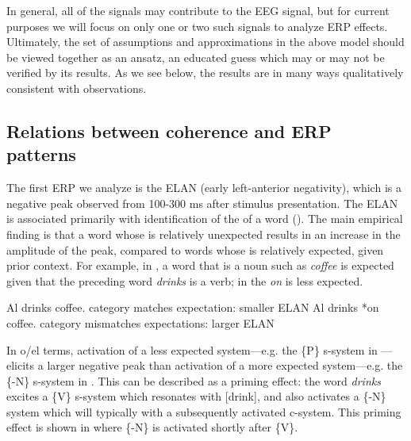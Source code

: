 In general, all of the  signals may contribute to the EEG signal, but for current purposes we will focus on only one or two such signals to analyze ERP effects. Ultimately, the set of assumptions and approximations in the above model should be viewed together as an ansatz, an educated guess which may or may not be verified by its results. As we see below, the results are in many ways qualitatively consistent with observations.

\subsection{Relations between coherence and ERP patterns}

The first ERP we analyze is the ELAN (early left-anterior negativity), which is a negative peak observed from 100-300 ms after stimulus presentation. The ELAN is associated primarily with identification of the  of a word (\citealt{Friederici2002,HahneFriederici1999,SteinhauerDrury2012}). The main empirical finding is that a word whose  is relatively unexpected results in an increase in the amplitude of the peak, compared to words whose  is relatively expected, given prior context. For example, in , a word that is a noun such as \textit{coffee} is expected given that the preceding word \textit{drinks} is a  verb; in  the  \textit{on} is less expected.

\ea\label{ex:6:23}
\ea\label{ex:6:23a} Al drinks coffee. \break category matches expectation: smaller ELAN
\ex\label{ex:6:23b} Al drinks *on coffee. \break category mismatches expectations: larger ELAN
\z
\z

In o/el terms, activation of a less expected system—e.g. the \{P\} s-system in —elicits a larger negative peak than activation of a more expected system—e.g. the \{-N\} s-system in . This can be described as a priming effect: the word \textit{drinks} excites a \{V\} s-system which resonates with [drink], and also activates a \{-N\} system which will typically  with a subsequently activated c-system. This priming effect is shown in {} where \{-N\} is activated shortly after \{V\}. 


